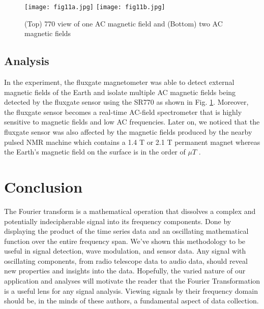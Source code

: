 \documentclass[prl,twocolumn,superscriptaddress,floatfix]{revtex4}
\begin{document}
\begin{figure}[H]
    \begin{center}
    \texttt{[image: fig11a.jpg]}
    \texttt{[image: fig11b.jpg]}
    \caption{\label{fig:11} (Top) 770 view of one AC magnetic field and (Bottom) two AC magnetic fields}
    \end{center}
\end{figure}
\subsection{Analysis}

In the experiment, the fluxgate magnetometer was able to detect external magnetic fields of the Earth and isolate multiple AC magnetic fields being detected by the fluxgate sensor using the SR770 as shown in Fig. \ref{fig:11}. Moreover, the fluxgate sensor becomes a real-time AC-field spectrometer that is highly sensitive to magnetic fields and low AC frequencies.
Later on, we noticed that the fluxgate sensor was also affected by the magnetic fields produced by the nearby pulsed NMR machine which contains a 1.4 T or 2.1 T permanent magnet whereas the Earth's magnetic field on the surface is in the order of $\mu T$ \cite{Cornell2000}.

  \section{Conclusion}
The Fourier transform is a mathematical operation that dissolves a complex and potentially indecipherable signal into its frequency components. Done by displaying the product of the time series data and an oscillating mathematical function over the entire frequency span. We've shown this methodology to be useful in signal detection, wave modulation, and sensor data. Any signal with oscillating components, from radio telescope data to audio data, should reveal new properties and insights into the data. 
Hopefully, the varied nature of our application and analyses will motivate the reader that the Fourier Transformation is a useful lens for any signal analysis.
Viewing signals by their frequency domain should be, in the minds of these authors, a fundamental aspect of data collection.

\nocite{Butz2015}

\end{document}
